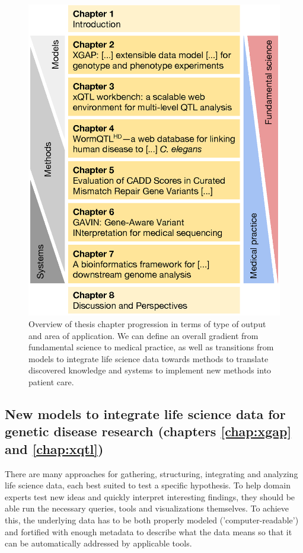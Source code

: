 \begin{figure}
\centering
\includegraphics[width=1.0\linewidth]{img/introduction_chapters.eps}
\caption[Overview of thesis chapter progression]{Overview of thesis chapter progression in terms of type of output and area of application. We can define an overall gradient from fundamental science to medical practice, as well as transitions from models to integrate life science data towards methods to translate discovered knowledge and systems to implement new methods into patient care.}
\label{fig:introduction_chapters}
\end{figure}

\subsection[New models to integrate life science data]{New models to integrate life science data for genetic disease research (chapters \ref{chap:xgap} and \ref{chap:xqtl})}

There are many approaches for gathering, structuring, integrating and analyzing life science data, each best suited to test a spe\-ci\-fic hy\-po\-the\-sis\cite{Ritchie_2015}.
To help domain experts test new ideas and quickly interpret interesting findings, they should be able run the necessary queries, tools and visualizations themselves.
To achieve this, the underlying data has to be both properly modeled ('computer-readable') and fortified with enough metadata to describe what the data means\cite{Wilkinson_2016} so that it can be automatically addressed by applicable tools.

